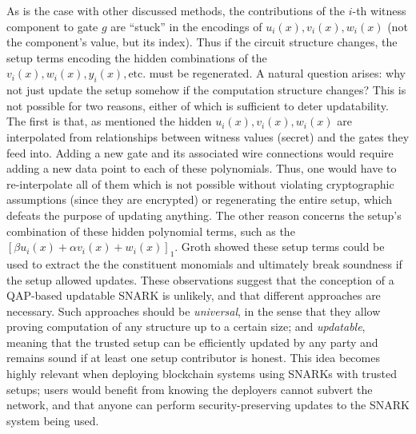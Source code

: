 \noindent As is the case with other discussed methods, the contributions of the $i$-th witness component to gate $g$ are ``stuck'' in the encodings of $u_i(x), v_i(x), w_i(x)$ (not the component's value, but its index). Thus if the circuit structure changes, the setup terms encoding the hidden combinations of the $v_i(x), w_i(x), y_i(x), \text{etc.}$ must be regenerated. A natural question arises: why not just update the setup somehow if the computation structure changes? This is not possible for two reasons, either of which is sufficient to deter updatability. The first is that, as mentioned the hidden $u_i(x), v_i(x), w_i(x)$ are interpolated from relationships between witness values (secret) and the gates they feed into. Adding a new gate and its associated wire connections would require adding a new data point to each of these polynomials. Thus, one would have to re-interpolate all of them which is not possible without violating cryptographic assumptions (since they are encrypted) or regenerating the entire setup, which defeats the purpose of updating anything. The other reason concerns the setup's combination of these hidden polynomial terms, such as the $[\beta u_i(x) + \alpha v_i(x) + w_i(x)]_1$. Groth \cite{grothupdatable} showed these setup terms could be used to extract the the constituent monomials and ultimately break soundness if the setup allowed updates. These observations suggest that the conception of a QAP-based updatable SNARK is unlikely, and that different approaches are necessary. Such approaches should be \textit{universal}, in the sense that they allow proving computation of any structure up to a certain size; and \textit{updatable}, meaning that the trusted setup can be efficiently updated by any party and remains sound if at least one setup contributor is honest. This idea becomes highly relevant when deploying blockchain systems using SNARKs with trusted setups; users would benefit from knowing the deployers cannot subvert the network, and that anyone can perform security-preserving updates to the SNARK system being used.\\

